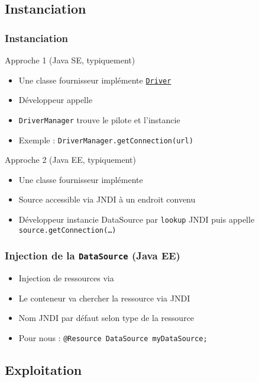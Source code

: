 \documentclass[english, french]{beamer}
\begin{document}
\subsection{Instanciation}
\begin{frame}
	\frametitle{Instanciation}
	\begin{block}{Approche 1 (Java SE, typiquement)}
		\begin{itemize}
			\item Une classe fournisseur implémente \href{https://docs.oracle.com/javase/8/docs/api/java/sql/Driver.html}{\texttt{Driver}}
			\item Développeur appelle 
			\item \texttt{DriverManager} trouve le pilote et l’instancie
			\item Exemple : \texttt{DriverManager.getConnection(url)}
		\end{itemize}
	\end{block}
	\begin{block}{Approche 2 (Java EE, typiquement)}
		\begin{itemize}
			\item Une classe fournisseur implémente 
			\item Source accessible via JNDI à un endroit convenu
			\item Développeur instancie DataSource par \texttt{lookup} JNDI puis appelle \texttt{source.getConnection(…)}
		\end{itemize}
	\end{block}
\end{frame}

\begin{frame}
	\frametitle{Injection de la \texttt{DataSource} (Java EE)}
	\begin{itemize}
		\item Injection de ressources via 
		\item Le conteneur va chercher la ressource via JNDI
		\item Nom JNDI par défaut selon type de la ressource
		\item Pour nous : \texttt{@Resource DataSource myDataSource;}
	\end{itemize}
\end{frame}

\subsection{Exploitation}
\end{document}
